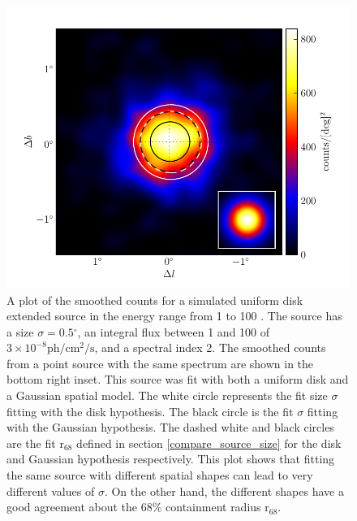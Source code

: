 \documentclass[12pt,preprint]{aastex}
\newcommand{\gev}{\text{GeV}\xspace}
\newcommand{\ph}{\text{ph}\xspace}
\newcommand{\cm}{\text{cm}\xspace}
\renewcommand{\sec}{\text{s}\xspace}
\newcommand{\rsixeight}{{\ensuremath{\text{r}_{68}}}\xspace}
\renewcommand{\deg}{\ensuremath{^\circ}\xspace}
\begin{document}
  \begin{figure}
    \begin{center}
      \includegraphics{mc_plots/compare_r68.pdf}
      \end{center}
      \caption{A plot of the smoothed counts for a simulated uniform
        disk extended source in the energy range from 1 \gev to 100 \gev.
        The source has a size $\sigma=0.5\deg$, an integral flux between
        1 \gev and 100 \gev of $3\times 10^{-8}\ph/\cm^2/\sec$, and
        a spectral index 2.  The smoothed counts from a point source
        with the same spectrum are shown in the bottom right inset.
        This source was fit with both a uniform disk and a Gaussian
        spatial model.  The white circle represents the fit size $\sigma$
        fitting with the disk hypothesis.  The black circle is the fit
        $\sigma$ fitting with the Gaussian hypothesis.  The dashed white
        and black circles are the fit \rsixeight defined in section
        \ref{compare_source_size} for the disk and Gaussian hypothesis
        respectively.  This plot shows that fitting the same source with
        different spatial shapes can lead to very different values of
        $\sigma$. On the other hand, the different shapes have a good
        agreement about the 68\% containment radius \rsixeight.
      }\label{compare_r68}
    \end{figure}
\end{document}
